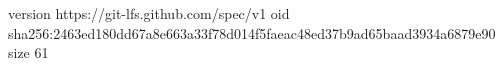 version https://git-lfs.github.com/spec/v1
oid sha256:2463ed180dd67a8e663a33f78d014f5faeac48ed37b9ad65baad3934a6879e90
size 61
